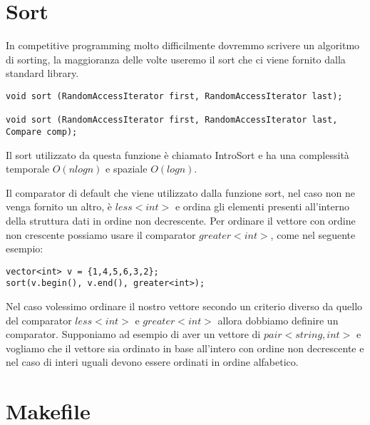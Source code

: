 \documentclass{article}
\begin{document}
\section{Sort}

In competitive programming molto difficilmente dovremmo scrivere un algoritmo di sorting, la maggioranza delle volte useremo il sort che ci viene fornito dalla standard library.

\begin{lstlisting}
void sort (RandomAccessIterator first, RandomAccessIterator last);

void sort (RandomAccessIterator first, RandomAccessIterator last, Compare comp);
\end{lstlisting}

Il sort utilizzato da questa funzione è chiamato IntroSort e ha una complessità temporale $O(nlogn)$ e spaziale $O(logn)$.

Il comparator di default che viene utilizzato dalla funzione sort, nel caso non ne venga fornito un altro, è $less<int>$ e ordina gli elementi presenti all'interno della struttura dati in ordine non decrescente. Per ordinare il vettore con ordine non crescente possiamo usare il comparator $greater<int>$, come nel seguente esempio:

\begin{lstlisting}
vector<int> v = {1,4,5,6,3,2};
sort(v.begin(), v.end(), greater<int>);
\end{lstlisting}

Nel caso volessimo ordinare il nostro vettore secondo un criterio diverso da quello del comparator $less<int>$ e $greater<int>$ allora dobbiamo definire un comparator. Supponiamo ad esempio di aver un vettore di $pair<string, int>$ e vogliamo che il vettore sia ordinato in base all'intero con ordine non decrescente e nel caso di interi uguali devono essere ordinati in ordine alfabetico.



\section{Makefile}


\end{document}
